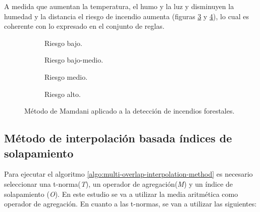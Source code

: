 A medida que aumentan la temperatura, el humo y la luz y disminuyen la humedad y la distancia el riesgo de incendio aumenta (figuras \ref{fig:fire-detection-mamdani-medium} y \ref{fig:fire-detection-mamdani-high}), lo cual es coherente con lo expresado en el conjunto de reglas.

\begin{figure}[t]
	\centering
	\begin{subfigure}[b]{0.45\textwidth}
		\setlength\figureheight{3cm}
		\setlength\figurewidth{6cm}
		
		\caption{Riesgo bajo.}\label{fig:fire-detection-mamdani-low}
	\end{subfigure}
	\qquad
	\begin{subfigure}[b]{0.45\textwidth}
		\setlength\figureheight{3cm}
		\setlength\figurewidth{6cm}
		
		\caption{Riesgo bajo-medio.}\label{fig:fire-detection-mamdani-low-medium}
	\end{subfigure}
	
	\vspace{1cm}
	\begin{subfigure}[b]{0.45\textwidth}
		\setlength\figureheight{3cm}
		\setlength\figurewidth{6cm}
		
		\caption{Riesgo medio.}\label{fig:fire-detection-mamdani-medium}
	\end{subfigure}
	\qquad
	\begin{subfigure}[b]{0.45\textwidth}
		\setlength\figureheight{3cm}
		\setlength\figurewidth{6cm}
		
		\caption{Riesgo alto.}\label{fig:fire-detection-mamdani-high}
	\end{subfigure}
	\caption{Método de Mamdani aplicado a la detección de incendios forestales.}
	\label{fig:mamdani-fire-detection-example}
\end{figure}

\subsection{Método de interpolación basada índices de solapamiento}
Para ejecutar el algoritmo \ref{algo:multi-overlap-interpolation-method} es necesario seleccionar una t-norma(\emph{T}), un operador de agregación(\emph{M}) y un índice de solapamiento (\emph{O}). En este estudio se va a utilizar la media aritmética como operador de agregación. En cuanto a las t-normas, se van a utilizar las siguientes:

